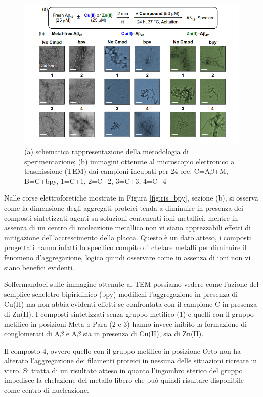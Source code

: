 \documentclass[a4paper, 12pt]{article}
\begin{document}
\begin{figure}[H]
	\centering
	\includegraphics[width=\linewidth]{immagini/ris_bpy2.png}
	\caption{(a) schematica rappresentazione della metodologia di sperimentazione; (b) immagini ottenute al microscopio elettronico a trasmissione (TEM) dai campioni incubati per 24 ore. C=A$\beta$+M, B=C+bpy, 1=C+1, 2=C+2, 3=C+3, 4=C+4 }
	\label{fig:ris_bpy2}
\end{figure}

Nalle corse elettroforetiche mostrate in Figura \ref{fig:ris_bpy}, sezione (b), si osserva come la dimensione degli aggregati proteici tenda a diminuire in presenza dei composti sintetizzati agenti su soluzioni contenenti ioni metallici, mentre in assenza di un centro di nucleazione metallico non vi siano apprezzabili effetti di mitigazione dell'accrescimento della placca. Questo è un dato atteso, i composti progettati hanno infatti lo specifico compito di chelare metalli per diminuire il fenomeno d'aggregazione, logico quindi osservare come in assenza di ioni non vi siano benefici evidenti.

Soffermandoci sulle immagine ottenute al TEM possiamo vedere come l'azione del semplice scheletro bipiridinico (bpy) modifichi l'aggregazione in presenza di Cu(II) ma non abbia evidenti effetti se confrontata con il campione C in presenza di Zn(II). I composti sintetizzati senza gruppo metilico (1) e quelli con il gruppo metilico in posizioni Meta o Para (2 e 3) hanno invece inibito la formazione di conglomerati di A$\beta$ e A$\beta$ sia in presenza di Cu(II), sia di Zn(II).

Il composto 4, ovvero quello con il gruppo metilico in posizione Orto non ha alterato l’aggregazione dei filamenti proteici in nessuna delle situazioni ricreate in vitro. Si tratta di un risultato atteso in quanto l’ingombro sterico del gruppo  impedisce la chelazione del metallo libero che può quindi risultare disponibile come centro di nucleazione.
\end{document}
